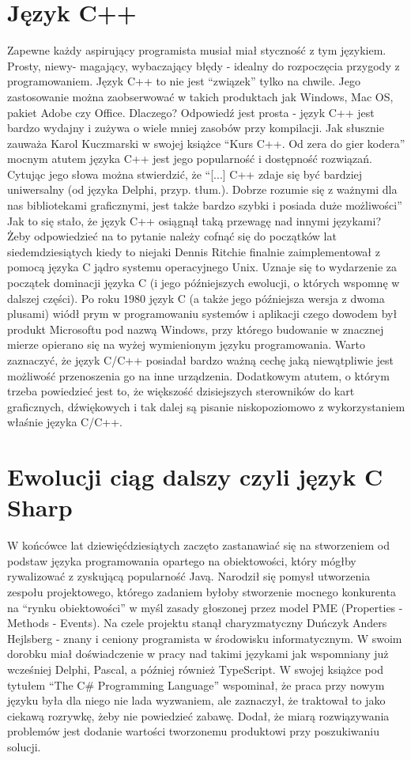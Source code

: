 \documentclass{article}
\begin{document}
\section{Język C++}
Zapewne każdy aspirujący programista musiał miał styczność z tym językiem. Prosty, niewy- magający, wybaczający błędy - idealny do rozpoczęcia przygody z programowaniem. Język C++ to nie jest “związek” tylko na chwile. Jego zastosowanie można zaobserwować w takich produktach jak Windows, Mac OS, pakiet Adobe czy Office. Dlaczego? Odpowiedź jest prosta - język C++ jest bardzo wydajny i zużywa o wiele mniej zasobów przy kompilacji. Jak słusznie zauważa Karol Kuczmarski w swojej książce “Kurs C++. Od zera do gier kodera” \cite{ref5} mocnym atutem języka C++ jest jego popularność i dostępność rozwiązań. Cytując jego słowa można stwierdzić, że “[...] C++ zdaje się być bardziej uniwersalny (od języka Delphi, przyp. tłum.). Dobrze rozumie się z ważnymi dla nas bibliotekami graficznymi, jest także bardzo szybki i posiada duże możliwości” Jak to się stało, że język C++ osiągnął taką przewagę nad innymi językami? Żeby odpowiedzieć na to pytanie należy cofnąć się do początków lat siedemdziesiątych kiedy to niejaki Dennis Ritchie finalnie zaimplementował z pomocą języka C jądro systemu operacyjnego Unix. Uznaje się to wydarzenie za początek dominacji języka C (i jego późniejszych ewolucji, o których 
wspomnę w dalszej części). Po roku 1980 język C (a także jego późniejsza wersja z dwoma plusami) wiódł prym w programowaniu systemów i aplikacji czego dowodem był produkt Microsoftu pod nazwą Windows, przy którego budowanie w znacznej mierze opierano się na wyżej wymienionym języku programowania. Warto zaznaczyć, że język C/C++ posiadał bardzo ważną cechę jaką niewątpliwie jest możliwość przenoszenia go na inne urządzenia. Dodatkowym atutem, o którym trzeba powiedzieć jest to, że większość dzisiejszych sterowników do kart graficznych, dźwiękowych i tak dalej są pisanie niskopoziomowo z wykorzystaniem właśnie języka C/C++.
\section*{\textbf{Ewolucji ciąg dalszy czyli język C Sharp}}
W końcówce lat dziewięćdziesiątych zaczęto zastanawiać się na stworzeniem od podstaw języka programowania opartego na obiektowości, który mógłby rywalizować z zyskującą popularność Javą. Narodził się pomysł utworzenia zespołu projektowego, którego zadaniem byłoby stworzenie mocnego konkurenta na “rynku obiektowości” w myśl zasady głoszonej przez model PME (Properties - Methods - Events). Na czele projektu stanął charyzmatyczny Duńczyk Anders Hejlsberg - znany i ceniony programista w środowisku informatycznym. W swoim dorobku miał doświadczenie w pracy nad takimi językami jak wspomniany już wcześniej Delphi, Pascal, a później również TypeScript. W swojej książce pod tytułem “The C\# Programming Language” \cite{ref6} wspominał, że praca przy nowym języku była dla niego nie lada wyzwaniem, ale zaznaczył, że traktował to jako ciekawą rozrywkę, żeby nie powiedzieć zabawę. Dodał, że miarą rozwiązywania problemów jest dodanie wartości tworzonemu produktowi przy poszukiwaniu solucji.
\end{document}

